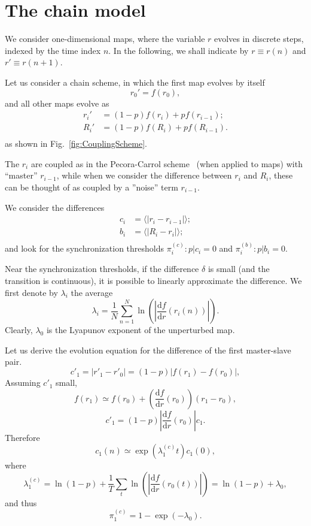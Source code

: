 \documentclass[runningheads]{llncs}
\begin{document}
\section{The chain model} \label{sec:model}
We consider one-dimensional maps, where the variable $r$ evolves in discrete steps, indexed by the time index $n$. In the following, we shall indicate by $r\equiv r(n)$ and $r'\equiv r(n+1)$. 

Let us consider a chain scheme, in which the first map evolves by itself 
\[
  r_0' = f(r_0),
\]
and all other maps evolve as 
\begin{equation}\label{eq:map}
  \begin{split}
    r_i' &= (1-p) f(r_i) + p f(r_{i-1});\\
    R_i' &= (1-p) f(R_i) + p f(R_{i-1}).\\
  \end{split}
\end{equation}
as shown in Fig.~\ref{fig:CouplingScheme}.

The $r_i$ are coupled as in the Pecora-Carrol scheme~\cite{Pecora1990,Pecora2015} (when applied to maps) with ``master'' $r_{i-1}$, while when we consider the difference between $r_i$ and $R_i$, these can be thought of as coupled by a ''noise'' term $r_{i-1}$. %

We consider the differences
\begin{equation}\label{eq:delta}
  \begin{split}
    c_i &= \langle|r_i-r_{i-1}|\rangle;\\
    b_{i} &= \langle|R_i-r_i|\rangle;\\
  \end{split}
\end{equation}
and look for the synchronization thresholds $\pi_{i}^{(c)}: p |c_i=0$ and $\pi_i^{(b)}: p|b_i=0$. 

Near the synchronization thresholds, if the difference $\delta$ is small (and the transition is continuous), it is possible to linearly approximate the difference. We first denote by $\lambda_i$ the average 
\[
  \lambda_i = \frac{1}{N} \sum_{n=1}^N \ln\left(\left|\frac{\mathrm{d}{f}}{\mathrm{d}r}(r_i(n))\right|\right).
\]
Clearly, $\lambda_0$ is the Lyapunov exponent of the unperturbed  map. %

Let us derive the evolution equation for the difference of the first master-slave pair. 
\[
  c'_1 = |r'_1-r'_{0}| = (1-p) \left|f(r_1) - f(r_{0})\right|,
\]
Assuming $c'_1$ small, 
\[
f(r_{1})\simeq f(r_0) + \left(\frac{\mathrm{d}{f}}{\mathrm{d}r}(r_0)\right)(r_1-r_0), 
\]
\[
  c'_1 =  (1-p) \left|\frac{\mathrm{d}{f}}{\mathrm{d}r}(r_{0})\right|c_1.
\]
Therefore 
\[
  c_1(n) \simeq  \exp(\lambda^{(c)}_1 t)c_1(0),
\]
where 
\begin{equation}\label{eq:liapCteo}
\lambda^{(c)}_1 = \ln(1-p) + \frac{1}{T} \sum_t \ln\left(\left|\frac{\mathrm{d}{f}}{\mathrm{d}r}(r_{0}(t))\right|\right)= \ln(1-p) + \lambda_{0},
\end{equation}
and thus 
\begin{equation}\label{eq:pic}
\pi^{(c)}_1 = 1-\exp(-\lambda_0).
\end{equation}
\end{document}
